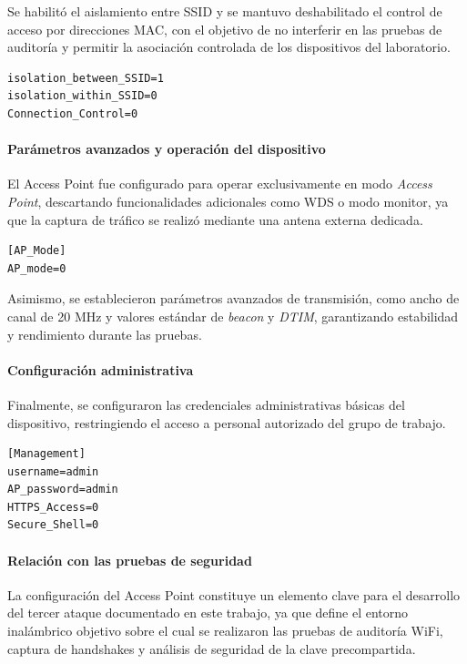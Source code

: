 Se habilitó el aislamiento entre SSID y se mantuvo deshabilitado el control de acceso por direcciones MAC, con el objetivo de no interferir en las pruebas de auditoría y permitir la asociación controlada de los dispositivos del laboratorio.

\begin{lstlisting}[caption={Parámetros de aislamiento y control de acceso}]
isolation_between_SSID=1
isolation_within_SSID=0
Connection_Control=0
\end{lstlisting}

\paragraph{Parámetros avanzados y operación del dispositivo}

El Access Point fue configurado para operar exclusivamente en modo \textit{Access Point}, descartando funcionalidades adicionales como WDS o modo monitor, ya que la captura de tráfico se realizó mediante una antena externa dedicada.

\begin{lstlisting}[caption={Modo de operación del Access Point}]
[AP_Mode]
AP_mode=0
\end{lstlisting}

Asimismo, se establecieron parámetros avanzados de transmisión, como ancho de canal de 20 MHz y valores estándar de \textit{beacon} y \textit{DTIM}, garantizando estabilidad y rendimiento durante las pruebas.

\paragraph{Configuración administrativa}

Finalmente, se configuraron las credenciales administrativas básicas del dispositivo, restringiendo el acceso a personal autorizado del grupo de trabajo.

\begin{lstlisting}[caption={Configuración administrativa del Access Point}]
[Management]
username=admin
AP_password=admin
HTTPS_Access=0
Secure_Shell=0
\end{lstlisting}

\paragraph{Relación con las pruebas de seguridad}

La configuración del Access Point constituye un elemento clave para el desarrollo del tercer ataque documentado en este trabajo, ya que define el entorno inalámbrico objetivo sobre el cual se realizaron las pruebas de auditoría WiFi, captura de handshakes y análisis de seguridad de la clave precompartida.

